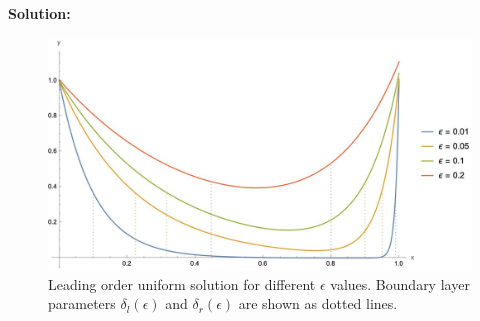 \documentclass[12pt, a4paper]{article}
\begin{document}
\begin{enumerate}
\begin{enumerate}
        \textbf{Solution:} 

        \begin{figure}[H]
            \centering
            \includegraphics[width=14cm]{568_HW5_Plot2.jpg}
            \caption{Leading order uniform solution for different $\epsilon$ values. Boundary layer parameters $\delta_l(\epsilon)$ and $\delta_r(\epsilon)$ are shown as dotted lines.}
        \end{figure}
    \end{enumerate}
\end{enumerate}
\end{document}
